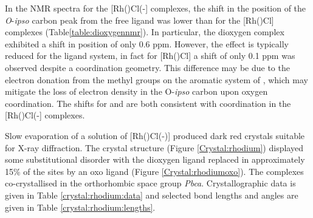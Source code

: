 
In the \carbon{} NMR spectra for the [Rh(\tBuxantphos)Cl(-] complexes, the shift in the position of the \emph{O}-\emph{ipso} carbon peak from the free ligand was lower than for the [Rh(\tBuxantphos)Cl] complexes (Table\ref{table:dioxygennmr}).  In particular, the \tButhixantphos{} dioxygen complex exhibited a shift in position of only 0.6 ppm.  However, the effect is typically reduced for the \tButhixantphos{} ligand system, in fact for [Rh(\tButhixantphos)Cl] a shift of only 0.1 ppm was observed despite a \POP{} coordination geometry.  This difference may be due to the electron donation from the methyl groups on the aromatic system of \tButhixantphos{}, which may mitigate the loss of electron density in the O-\emph{ipso} carbon upon oxygen coordination.  The shifts for \tBusixantphos{} and \tBuxantphos{} are both consistent with \POP{} coordination in the [Rh(\tBuxantphos)Cl(-] complexes.  

Slow evaporation of a  solution of [Rh(\tBuxantphosk)Cl(-)] produced dark red crystals suitable for X-ray diffraction.  The crystal structure (Figure \ref{Crystal:rhodium}) displayed some substitutional disorder with the dioxygen ligand replaced in approximately 15\% of the sites by an oxo ligand (Figure \ref{Crystal:rhodiumoxo}).  The complexes co-crystallised in the orthorhombic space group \emph{Pbca}.  Crystallographic data is given in Table \ref{crystal:rhodium:data} and selected bond lengths and angles are given in Table \ref{crystal:rhodium:lengths}.


